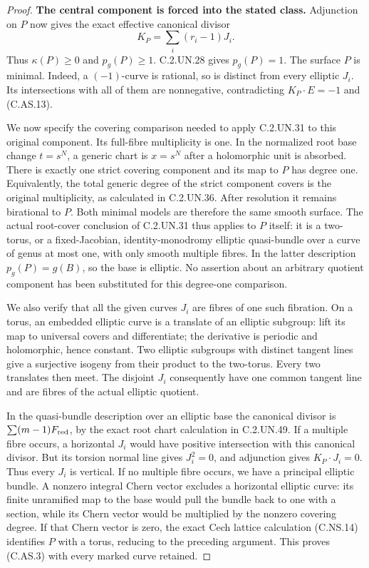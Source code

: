 \begin{proof}
\par\medskip\noindent\textbf{The central component is forced into the stated class.}
Adjunction on $P$ now gives the exact effective
canonical divisor
\[
                         K_P=\sum_i(r_i-1)J_i .         \tag{C.AS.13}
\]
Thus $\kappa(P)\ge0$ and $p_g(P)\ge1$.
C.2.UN.28 gives $p_g(P)=1$. The surface $P$
is minimal. Indeed, a $(-1)$-curve is rational,
so is distinct from every elliptic $J_i$.
Its intersections with all of them are
nonnegative, contradicting $K_P\cdot E=-1$
and (C.AS.13).

We now specify the covering comparison needed
to apply C.2.UN.31 to this original component.
Its full-fibre multiplicity is one. In the
normalized root base change $t=s^N$, a generic
chart is $x=s^N$ after a holomorphic unit is
absorbed. There is exactly one strict covering
component and its map to $P$ has degree one.
Equivalently, the total generic degree of the
strict component covers is the original
multiplicity, as calculated in C.2.UN.36.
After resolution it remains birational to $P$.
Both minimal models are therefore the same
smooth surface. The actual root-cover conclusion
of C.2.UN.31 thus applies to $P$ itself:
it is a two-torus, or a fixed-Jacobian,
identity-monodromy elliptic quasi-bundle over
a curve of genus at most one, with only smooth
multiple fibres. In the latter description
$p_g(P)=g(B)$, so the base is elliptic.
No assertion about an arbitrary quotient
component has been substituted for this
degree-one comparison.

We also verify that all the given curves
$J_i$ are fibres of one such fibration.
On a torus, an embedded elliptic curve is a
translate of an elliptic subgroup: lift its
map to universal covers and differentiate;
the derivative is periodic and holomorphic,
hence constant. Two elliptic subgroups with
distinct tangent lines give a surjective
isogeny from their product to the two-torus.
Every two translates then meet. The disjoint
$J_i$ consequently have one common tangent
line and are fibres of the actual elliptic
quotient.

In the quasi-bundle description over an
elliptic base the canonical divisor is
$\sum(m-1)F_{\rm red}$, by the exact root
chart calculation in C.2.UN.49.
If a multiple fibre occurs, a horizontal
$J_i$ would have positive intersection with
this canonical divisor. But its torsion
normal line gives $J_i^2=0$, and adjunction
gives $K_P\cdot J_i=0$. Thus every $J_i$
is vertical. If no multiple fibre occurs,
we have a principal elliptic bundle.
A nonzero integral Chern vector excludes
a horizontal elliptic curve: its finite
unramified map to the base would pull the
bundle back to one with a section, while
its Chern vector would be multiplied by
the nonzero covering degree. If that Chern
vector is zero, the exact Cech lattice
calculation (C.NS.14) identifies $P$ with
a torus, reducing to the preceding argument.
This proves (C.AS.3) with every marked
curve retained.


\end{proof}
